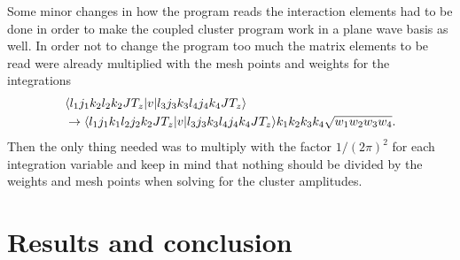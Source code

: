 Some minor changes in how the program reads the interaction elements 
had to be done in order  to make the coupled cluster program work in a plane wave basis as well. 
In order not to change  the program too much the matrix elements to be read were already multiplied with the mesh points and weights for the integrations
\begin{equation*}
		\begin{split}
             &\langle l_1j_1k_2l_2k_2JT_z|v|l_3j_3k_3l_4j_4k_4JT_z\rangle\\
             & \rightarrow \langle l_1j_1k_1l_2j_2k_2JT_z|v|l_3j_3k_3l_4j_4k_4JT_z\rangle k_1k_2k_3k_4\sqrt{w_1w_2w_3w_4}.
        \end{split}
\end{equation*}
Then the only thing needed was to multiply with the factor $1/(2\pi)^2$  for
each integration variable and keep in mind that nothing should be divided by
the weights and mesh points when solving for the cluster amplitudes. 

\clearpage


\section{Results and conclusion}

